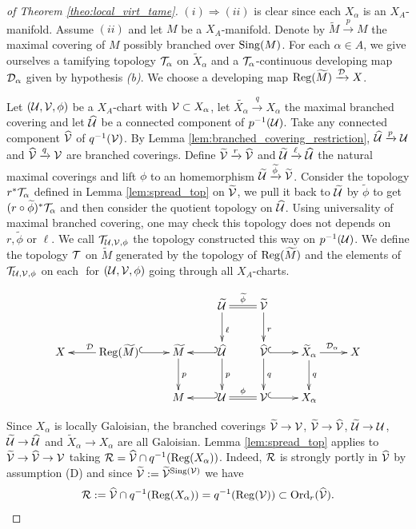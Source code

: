 \begin{proof}[of Theorem \ref{theo:local_virt_tame}]
 $(i)\Rightarrow (ii)$ is clear since each $X_\alpha$ is an $X_A$-manifold.
 Assume $(ii)$ and let $M$ be a $X_A$-manifold.
 Denote by $\widetilde M \xrightarrow{p} M$ the maximal covering of $M$ possibly branched over $\mathrm{Sing}(M)$. For each $\alpha\in A$, we give ourselves a tamifying topology $\mathcal{T}_\alpha$ on $\widetilde X_\alpha$ and a $\mathcal{T}_\alpha$-continuous developing map $\mathcal{D}_\alpha$ given by hypothesis {\it (b)}.   We choose a developing map $\mathrm{Reg}(\widetilde M)\xrightarrow{\mathcal{D}} X$.
 
  Let  $(\mathcal{U},\mathcal V,\phi)$ be a  $X_A$-chart with $\mathcal V\subset X_\alpha$, let $\widetilde{X_\alpha} \xrightarrow {q} X_{\alpha}$ the maximal branched covering and let $\widehat {\mathcal{U}}$ be a connected component of $p^{-1}(\mathcal{U})$. Take any connected component $\widehat {\mathcal V}$ of $q^{-1}(\mathcal V)$.
By Lemma \ref{lem:branched_covering_restriction}, $ \widehat {\mathcal{U}}\xrightarrow{p} \mathcal{U}$ and $\widehat {\mathcal V}\xrightarrow{q}\mathcal V$ are branched coverings. Define $\widetilde {\mathcal V}\xrightarrow{r}\widehat {\mathcal V}$ and $\widetilde {\mathcal{U}} \xrightarrow{\ell} \widehat {\mathcal{U}}$ 
the natural maximal coverings and lift $\phi$ to an homemorphism $\widetilde {\mathcal{U}}\xrightarrow{\widetilde \phi}\widetilde {\mathcal V}$.
  Consider the topology $r^*\mathcal{T}_\alpha$ defined in Lemma \ref{lem:spread_top} on $\widetilde {\mathcal V}$, we pull it back to $\widetilde {\mathcal{U}}$ by $\widetilde \phi$ to get $(r\circ\widetilde \phi)^*\mathcal{T}_\alpha$ and then consider the quotient topology on $\widehat {\mathcal{U}}$. Using universality of maximal branched covering,  one may check this topology does not depends on $r,\widetilde \phi$ or $\ell$. We call $\mathcal{T}_{\mathcal{U},\mathcal V,\phi}$ the topology constructed this way on $p^{-1}(\mathcal{U})$.
  We define the topology $\mathcal{T}$ on $\widetilde M$ generated by the topology of $\mathrm{Reg}(\widetilde M)$ and the elements of $\mathcal{T}_{\mathcal{U},\mathcal V,\phi}$ on each $ $ for $(\mathcal{U},\mathcal V,\phi)$ going through all $X_A$-charts.


 \begin{figure}[h!]
  $$\xymatrix{
  &&&\widetilde \U \ar@{=}[r]^{\widetilde\phi}\ar[d]^{\ell}&\widetilde \V\ar[d]^{r}&\\
  X&\ar[l]_{\D}\reg(\widetilde M)\ar@{^(->}[r]&\widetilde M\ar[d]^{p}&\widehat \U\ar@{_(->}[l]\ar[d]^{p} &\widehat \V\ar[d]^{q} \ar@{^(->}[r]& \widetilde X_\alpha\ar[d]^{q}\ar[r]^{\D_\alpha}&X\\
  &&M& \U\ar@{_(->}[l]\ar@{=}[r]^{\phi}&\V\ar@{^(->}[r]&X_\alpha
  }$$
 \end{figure}

 Since $X_\alpha$ is locally Galoisian, the branched coverings $\widetilde {\mathcal V}\rightarrow \mathcal V$, $\widetilde {\mathcal V}\rightarrow \widehat{\mathcal V}$, $\widetilde {\mathcal{U}}\rightarrow \mathcal{U}$, $\widetilde {\mathcal{U}}\rightarrow\widehat {\mathcal{U}}$  and $\widetilde X_\alpha\rightarrow X_\alpha$ are all Galoisian. Lemma \ref{lem:spread_top} applies to $\widetilde {\mathcal V} \rightarrow \widehat {\mathcal V} \rightarrow \mathcal V$ taking $\mathcal R= \widehat  {\mathcal V} \cap q^{-1}(\mathrm{Reg}(X_\alpha))$. Indeed, $\mathcal R$ is strongly portly in $\widehat {\mathcal V}$ by assumption (D) and  since $\widetilde {\mathcal V} := \widetilde {\mathcal V}^{\mathrm{Sing}(\mathcal V)}$ we have $$\mathcal R:=\widehat {\mathcal V} \cap q^{-1}(\mathrm{Reg}(X_\alpha))=  q^{-1}(\mathrm{Reg}(\mathcal V))\subset \mathrm{Ord}_r(\widehat {\mathcal V}).$$
 

\end{proof}
